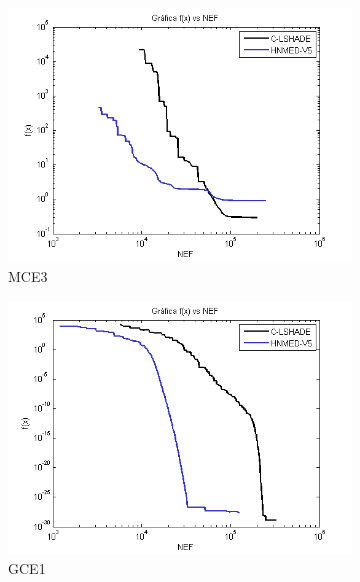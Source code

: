\begin{figure}
\begin{subfigure}[b]{0.49\linewidth}
		\includegraphics[width=\linewidth]{Figures/D-Grafica_Convergencia_Problema_3}
		\caption{MCE3} \label{fig:M3} 
	\end{subfigure}
	\begin{subfigure}[b]{0.49\linewidth}
		\includegraphics[width=\linewidth]{Figures/D-Grafica_Convergencia_Problema_4}
		\caption{GCE1} \label{fig:G1} 
	\end{subfigure}
	\begin{subfigure}[b]{0.49\linewidth}

\end{subfigure}
\end{figure}
